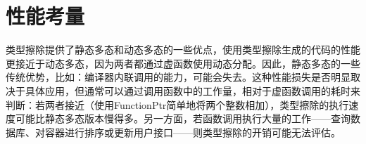 \section{性能考量}
类型擦除提供了静态多态和动态多态的一些优点，使用类型擦除生成的代码的性能更接近于动态多态，因为两者都通过虚函数使用动态分配。因此，静态多态的一些传统优势，比如：编译器内联调用的能力，可能会失去。这种性能损失是否明显取决于具体应用，但通常可以通过调用函数中的工作量，相对于虚函数调用的耗时来判断：若两者接近（使用FunctionPtr简单地将两个整数相加），类型擦除的执行速度可能比静态多态版本慢得多。另一方面，若函数调用执行大量的工作——查询数据库、对容器进行排序或更新用户接口——则类型擦除的开销可能无法评估。